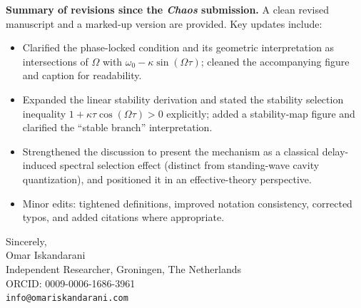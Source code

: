 \documentclass[11pt]{article}
\begin{document}
    \medskip
    \noindent \textbf{Summary of revisions since the \emph{Chaos} submission.}
    A clean revised manuscript and a marked-up version are provided. Key updates include:
    \begin{itemize}
        \item Clarified the phase-locked condition and its geometric interpretation as intersections of $\Omega$ with
        $\omega_0-\kappa\sin(\Omega\tau)$; cleaned the accompanying figure and caption for readability.
        \item Expanded the linear stability derivation and stated the stability selection inequality
        $1+\kappa\tau\cos(\Omega\tau)>0$ explicitly; added a stability-map figure and clarified the ``stable branch''
        interpretation.
        \item Strengthened the discussion to present the mechanism as a classical delay-induced spectral selection effect
        (distinct from standing-wave cavity quantization), and positioned it in an effective-theory perspective.
        \item Minor edits: tightened definitions, improved notation consistency, corrected typos, and added citations where appropriate.
    \end{itemize}

    \medskip
    \noindent Sincerely,\\[0.5em]
    \noindent Omar Iskandarani\\
    \noindent Independent Researcher, Groningen, The Netherlands\\
    \noindent ORCID: 0009-0006-1686-3961\\
    \noindent \texttt{info@omariskandarani.com}
\end{document}
